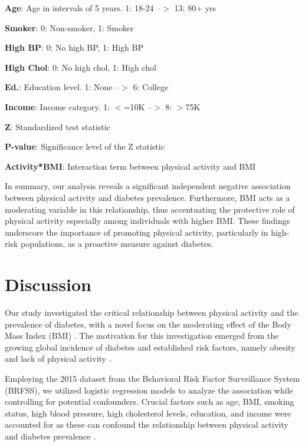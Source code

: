 \documentclass[11pt]{article}
\begin{document}
\begin{table}[h]
\begin{threeparttable}
\begin{tablenotes}
\item \textbf{Age}: Age in intervals of 5 years. 1: 18-24 --$>$ 13: 80+ yrs
\item \textbf{Smoker}: 0: Non-smoker, 1: Smoker
\item \textbf{High BP}: 0: No high BP, 1: High BP
\item \textbf{High Chol}: 0: No high chol, 1: High chol
\item \textbf{Ed.}: Education level. 1: None --$>$ 6: College
\item \textbf{Income}: Income category. 1: $<$=10K --$>$ 8: $>$75K
\item \textbf{Z}: Standardized test statistic
\item \textbf{P-value}: Significance level of the Z statistic
\item \textbf{Activity*BMI}: Interaction term between physical activity and BMI
\end{tablenotes}
\end{threeparttable}
\end{table}


In summary, our analysis reveals a significant independent negative association between physical activity and diabetes prevalence. Furthermore, BMI acts as a moderating variable in this relationship, thus accentuating the protective role of physical activity especially among individuals with higher BMI. These findings underscore the importance of promoting physical activity, particularly in high-risk populations, as a proactive measure against diabetes.

\section*{Discussion}

Our study investigated the critical relationship between physical activity and the prevalence of diabetes, with a novel focus on the moderating effect of the Body Mass Index (BMI) \cite{Wild2006RiskFF, Bohn2015ImpactOP}. The motivation for this investigation emerged from the growing global incidence of diabetes and established risk factors, namely obesity and lack of physical activity \cite{Akter2014PrevalenceOD, Lam2012TheWD}. 

Employing the 2015 dataset from the Behavioral Risk Factor Surveillance System (BRFSS), we utilized logistic regression models to analyze the association while controlling for potential confounders. Crucial factors such as age, BMI, smoking status, high blood pressure, high cholesterol levels, education, and income were accounted for as these can confound the relationship between physical activity and diabetes prevalence \cite{Menard1996AppliedLR}.
\end{document}
